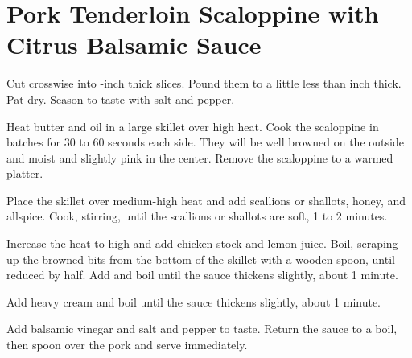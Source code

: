 \section{Pork Tenderloin Scaloppine with Citrus Balsamic Sauce}
\begin{recipe}
	
	
	
	Cut crosswise into -inch thick slices. Pound them to a little less than  inch thick. Pat dry. Season to taste with salt and pepper.
	
	
	Heat butter and oil in a large skillet over high heat. Cook the scaloppine in batches for 30 to 60 seconds each side. They will be well browned on the outside and moist and slightly pink in the center. Remove the scaloppine to a warmed platter.
	
	
	
	Place the skillet over medium-high heat and add scallions or shallots, honey, and allspice. Cook, stirring, until the scallions or shallots are soft, 1 to 2 minutes.
	
	Increase the heat to high and add chicken stock and lemon juice. Boil, scraping up the browned bits from the bottom of the skillet with a wooden spoon, until reduced by half. Add and boil until the sauce thickens slightly, about 1 minute.
	
	Add heavy cream and boil until the sauce thickens slightly, about 1 minute.
	
	Add balsamic vinegar and salt and pepper to taste. Return the sauce to a boil, then spoon over the pork and serve immediately.
	
	
\end{recipe}
